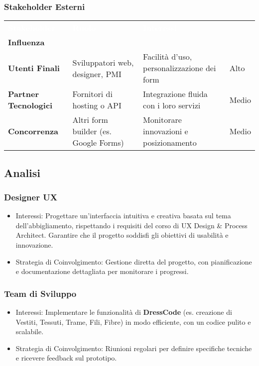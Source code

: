 \subsubsection{Stakeholder Esterni}
\begin{tabularx}{\textwidth}{|>{\centering\arraybackslash}l|>{\centering\arraybackslash}X|>{\centering\arraybackslash}X|>{\centering\arraybackslash}l|}
\hline
\rowcolor{Primary}
\textcolor{white}{\textbf{Stakeholder}} & 
\textcolor{white}{\textbf{Ruolo}} & 
\textcolor{white}{\textbf{Interessi}} & 
\textcolor{white}{\makecell{\textbf{Livello di} \\ \textbf{Influenza}}} \\ \hline
\textbf{Utenti Finali} & Sviluppatori web, designer, PMI & Facilità d'uso, personalizzazione dei form & Alto \\ \hline
\textbf{Partner Tecnologici} & Fornitori di hosting o API & Integrazione fluida con i loro servizi & Medio \\ \hline
\textbf{Concorrenza} & Altri form builder (es. Google Forms) & Monitorare innovazioni e posizionamento & Medio \\ \hline
\end{tabularx}

\subsection{Analisi}

\subsubsection{Designer UX}
\begin{itemize}
\item Interessi: Progettare un'interfaccia intuitiva e creativa basata sul tema dell'abbigliamento, rispettando i requisiti del corso di UX Design \& Process Architect. Garantire che il progetto soddisfi gli obiettivi di usabilità e innovazione. \\
\item Strategia di Coinvolgimento: Gestione diretta del progetto, con pianificazione e documentazione dettagliata per monitorare i progressi.
\end{itemize}

\subsubsection{Team di Sviluppo}
\begin{itemize}
\item Interessi: Implementare le funzionalità di \textbf{DressCode} (es. creazione di Vestiti, Tessuti, Trame, Fili, Fibre) in modo efficiente, con un codice pulito e scalabile. \\
\item Strategia di Coinvolgimento: Riunioni regolari per definire specifiche tecniche e ricevere feedback sul prototipo.
\end{itemize}


